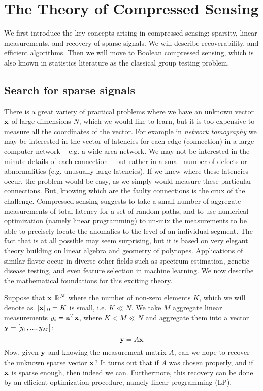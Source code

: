 \section{The Theory of Compressed Sensing}

We first introduce the key concepts arising in compressed sensing: sparsity, 
linear measurements, and recovery of sparse signals. We will describe recoverability, 
and efficient algorithms. Then we will move to Boolean compressed sensing, which is 
also known in statistics literature as the classical group testing problem.

\subsection{Search for sparse signals}

There is a great variety of practical problems where we have an unknown vector $\mathbf{x}$
of large dimensions $N$, which we would like to learn, but it is too expensive to measure all 
the coordinates of the vector. For example in {\em network tomography} we may be interested
in the vector of latencies for each edge (connection) in a large computer network -- e.g. 
a wide-area network. We may not be interested in the minute details of each connection -- but
rather in a small number of defects or abnormalities (e.g. unusually large latencies). If we 
knew where these latencies occur, the problem would be easy, as we simply would measure these 
particular connections. But, knowing which are the faulty connections is the crux of the challenge. 
Compressed sensing suggests to take a small number of aggregate measurements of total latency for 
a set of random paths, and to use numerical optimization (namely linear programming) to un-mix the 
measurements to be able to precisely locate the anomalies to the level of an individual segment.  
The fact that is at all possible may seem surprising, but it is based on very elegant theory 
building on linear algebra and geometry of polytopes.  Applications of similar flavor occur in 
diverse other fields such as spectrum estimation, genetic disease testing, and even feature 
selection in machine learning. We now describe the mathematical foundations for this exciting theory. 

Suppose that $\mathbf{x}$ $\mathbb{R}^N$ where the number of non-zero elements $K$, which we will denote as 
$\Vert \mathbf{x} \Vert_0 = K$ is small, i.e.  $K \ll N$.   We take $M$ aggregate linear measurements 
$y_i = \mathbf{a}^T \mathbf{x}$, where $K < M \ll N$ and aggregate them into a vector $\mathbf{y} = [y_1, ..., y_M]$:
\begin{equation}
\mathbf{y} = A \mathbf{x}
\end{equation}
Now, given $\mathbf{y}$ and knowing the measurement matrix $A$, can we hope to recover the unknown 
sparse vector $\mathbf{x}$?  It turns out that if $A$ was chosen properly, and if $\mathbf{x}$ is sparse 
enough, then indeed we can. Furthermore, this recovery can be done by an efficient optimization
procedure, namely linear programming (LP). 

